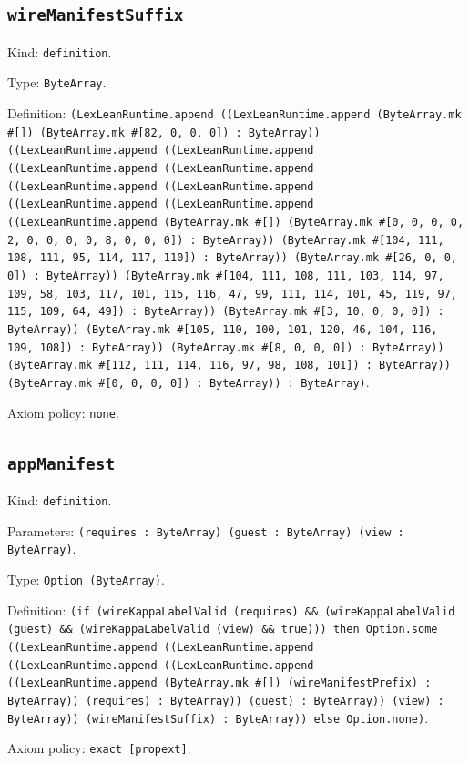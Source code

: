 \documentclass[11pt]{article}
\begin{document}
\subsection*{\texttt{wireManifestSuffix}}
\noindent Kind: \texttt{definition}.\par
\noindent Type: \texttt{ByteArray}.\par
\noindent Definition: \texttt{(LexLeanRuntime.append ((LexLeanRuntime.append (ByteArray.mk \#[]) (ByteArray.mk \#[82, 0, 0, 0]) : ByteArray)) ((LexLeanRuntime.append ((LexLeanRuntime.append ((LexLeanRuntime.append ((LexLeanRuntime.append ((LexLeanRuntime.append ((LexLeanRuntime.append ((LexLeanRuntime.append ((LexLeanRuntime.append ((LexLeanRuntime.append (ByteArray.mk \#[]) (ByteArray.mk \#[0, 0, 0, 0, 2, 0, 0, 0, 0, 8, 0, 0, 0]) : ByteArray)) (ByteArray.mk \#[104, 111, 108, 111, 95, 114, 117, 110]) : ByteArray)) (ByteArray.mk \#[26, 0, 0, 0]) : ByteArray)) (ByteArray.mk \#[104, 111, 108, 111, 103, 114, 97, 109, 58, 103, 117, 101, 115, 116, 47, 99, 111, 114, 101, 45, 119, 97, 115, 109, 64, 49]) : ByteArray)) (ByteArray.mk \#[3, 10, 0, 0, 0]) : ByteArray)) (ByteArray.mk \#[105, 110, 100, 101, 120, 46, 104, 116, 109, 108]) : ByteArray)) (ByteArray.mk \#[8, 0, 0, 0]) : ByteArray)) (ByteArray.mk \#[112, 111, 114, 116, 97, 98, 108, 101]) : ByteArray)) (ByteArray.mk \#[0, 0, 0, 0]) : ByteArray)) : ByteArray)}.\par
\noindent Axiom policy: \texttt{none}.\par
\subsection*{\texttt{appManifest}}
\noindent Kind: \texttt{definition}.\par
\noindent Parameters: \texttt{(requires : ByteArray) (guest : ByteArray) (view : ByteArray)}.\par
\noindent Type: \texttt{Option (ByteArray)}.\par
\noindent Definition: \texttt{(if (wireKappaLabelValid (requires) \&\& (wireKappaLabelValid (guest) \&\& (wireKappaLabelValid (view) \&\& true))) then Option.some ((LexLeanRuntime.append ((LexLeanRuntime.append ((LexLeanRuntime.append ((LexLeanRuntime.append ((LexLeanRuntime.append (ByteArray.mk \#[]) (wireManifestPrefix) : ByteArray)) (requires) : ByteArray)) (guest) : ByteArray)) (view) : ByteArray)) (wireManifestSuffix) : ByteArray)) else Option.none)}.\par
\noindent Axiom policy: \texttt{exact [propext]}.\par
\end{document}

